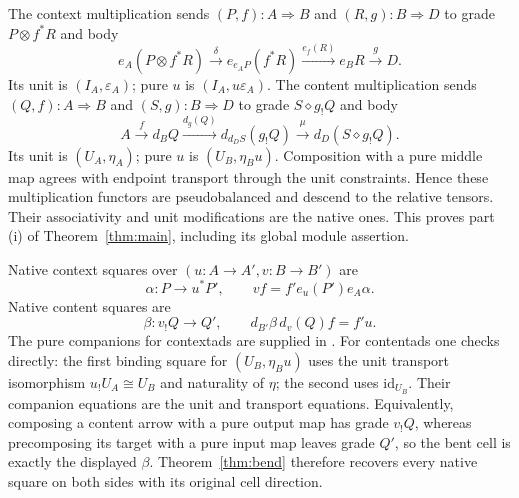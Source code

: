 \documentclass[11pt]{article}
\theoremstyle{definition}
\newcommand{\id}{\mathrm{id}}
\begin{document}
The context multiplication sends $(P,f):A\Rightarrow B$ and
$(R,g):B\Rightarrow D$ to grade $P\otimes f^*R$ and body
\begin{equation}\label{eq:ctxcomp}
 e_A(P\otimes f^*R)\xrightarrow{\delta}e_{e_AP}(f^*R)
 \xrightarrow{e_f(R)}e_BR\xrightarrow{g}D.
\end{equation}
Its unit is $(I_A,\varepsilon_A)$; pure $u$ is $(I_A,u\varepsilon_A)$.
The content multiplication sends $(Q,f):A\Rightarrow B$ and
$(S,g):B\Rightarrow D$ to grade $S\diamond g_!Q$ and body
\begin{equation}\label{eq:cntcomp}
 A\xrightarrow{f}d_BQ\xrightarrow{d_g(Q)}d_{d_DS}(g_!Q)
 \xrightarrow{\mu}d_D(S\diamond g_!Q).
\end{equation}
Its unit is $(U_A,\eta_A)$; pure $u$ is $(U_B,\eta_Bu)$.
Composition with a pure middle map agrees with endpoint transport through the
unit constraints. Hence these multiplication functors are pseudobalanced
and descend to the relative tensors. Their associativity and unit
modifications are the native ones. This proves part (i) of
Theorem~\ref{thm:main}, including its global module assertion.

Native context squares over $(u:A\to A',v:B\to B')$ are
\[
 \alpha:P\to u^*P',\qquad vf=f'e_u(P')e_A\alpha.
\]
Native content squares are
\[
 \beta:v_!Q\to Q',\qquad d_{B'}\beta\,d_v(Q)f=f'u.
\]
The pure companions for contextads are supplied in
\cite[Theorem 4.24]{CapucciMyers}. For contentads one checks directly: the
first binding square for $(U_B,\eta_Bu)$ uses the unit transport isomorphism
$u_!U_A\cong U_B$ and naturality of $\eta$; the second uses $\id_{U_B}$.
Their companion equations are the unit and transport equations. Equivalently,
composing a content arrow with a pure output map has grade $v_!Q$, whereas
precomposing its target with a pure input map leaves grade $Q'$, so the bent
cell is exactly the displayed $\beta$. Theorem~\ref{thm:bend} therefore
recovers every native square on both sides with its original cell direction.
\end{document}
